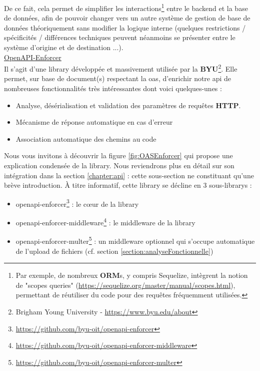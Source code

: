 De ce fait, cela permet de simplifier les interactions\footnote{
    Par exemple, de nombreux \textbf{ORM}s, y compris Sequelize, intègrent la notion de "scopes queries" (\url{https://sequelize.org/master/manual/scopes.html}), permettant de réutiliser du code pour des requêtes fréquemment utilisées.
} entre le \gls{backend} et la base de données, afin de pouvoir changer vers un autre système de gestion de base de données théoriquement sans modifier la logique interne 
(quelques restrictions / spécificités / différences techniques peuvent néanmoins se présenter entre le système d'origine et de destination ...). \\

\noindent\underline{OpenAPI-Enforcer}\\

Il s'agit d'une \gls{library} développée et massivement utilisée par la \textbf{BYU}\footnote{
    Brigham Young University - \url{https://www.byu.edu/about}
}. 
Elle permet, sur base de document(s) respectant la \Gls{oas}, d'enrichir notre \Gls{api} de nombreuses fonctionnalités très intéressantes dont voici quelques-unes :

\begin{itemize}
    \item Analyse, désérialisation et validation des paramètres de requêtes \textbf{HTTP}.
    \item Mécanisme de réponse automatique en cas d'erreur
    \item Association automatique des chemins au code
\end{itemize}

Nous vous invitons à découvrir la figure \ref{fig:OASEnforcer} qui propose une explication condensée de la \gls{library}.
Nous reviendrons plus en détail sur son intégration dans la section \ref{chapter:api} : cette sous-section ne constituant qu'une brève introduction.
À titre informatif, cette \gls{library} se décline en 3 sous-\glspl{library} :

\begin{itemize}
    \item openapi-enforcer\footnote{
        \url{https://github.com/byu-oit/openapi-enforcer}
    } : le cœur de la \gls{library}
    \item openapi-enforcer-middleware\footnote{
        \url{https://github.com/byu-oit/openapi-enforcer-middleware}
    } : le \gls{middleware} de la \gls{library}
    \item openapi-enforcer-multer\footnote{
        \url{https://github.com/byu-oit/openapi-enforcer-multer}
    } : un \gls{middleware} optionnel qui s'occupe automatique de l'upload de fichiers (cf. section \ref{section:analyseFonctionnelle})
\end{itemize}

